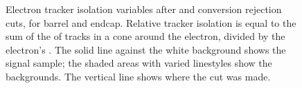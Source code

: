  \begin{figure}[htb]
  \begin{center}
  \end{center}
  \caption[\fixspacing Electron tracker isolation variables after \Et and conversion rejection cuts]
  {\fixspacing Electron tracker isolation variables after \Et and conversion rejection cuts, for %
   barrel and 
   endcap.  
  Relative tracker isolation is equal to the sum of the \pt of tracks 
  in a cone around the electron, divided by the electron's \pt.  
  The solid line against the white background shows the signal sample; 
  the shaded areas with varied linestyles show the backgrounds. 
  The vertical line shows where the cut was made.  
  }
  \label{fig:trkElecIsoVars}
 \end{figure}



